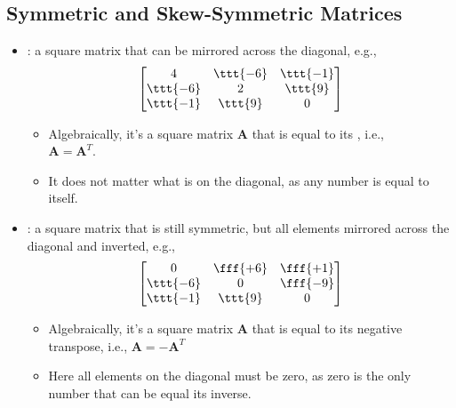 \begin{itemize}
  \subsection{Symmetric and Skew-Symmetric Matrices}\label{Symmetric and Skew-Symmetric Matrices}
  \begin{itemize}
    \item {}: a square matrix that can be mirrored across the diagonal, e.g.,
    \[%
    \begin{bmatrix}
    4 & \ttt{-6} & \ttt{-1} \\
    \ttt{-6} & 2 & \ttt{9} \\
    \ttt{-1} & \ttt{9} &  0
    \end{bmatrix}
    \]%
      \begin{itemize}
        \item Algebraically, it's a square matrix \(\bm{A}\) that is equal to its \hyperref[Transposition]{}, i.e., \\ \(\bm{A} = \bm{A}^T\).
        \item It does not matter what is on the diagonal, as any number is equal to itself. 
      \end{itemize}
    \item {}: a square matrix that is still symmetric, but all elements mirrored across the diagonal and inverted, e.g.,
    \[%
    \begin{bmatrix}
    0 & \fff{+6} & \fff{+1} \\
    \ttt{-6} & 0 & \fff{-9} \\
    \ttt{-1} & \ttt{9} &  0
    \end{bmatrix}
    \]%
    \begin{itemize}
      \item Algebraically, it's a square matrix \(\bm{A}\) that is equal to its negative transpose, i.e., \(\bm{A} = -\bm{A}^T\)
      \item Here all elements on the diagonal must be zero, as zero is the only number that can be equal its inverse. 
    \end{itemize}
  \end{itemize}
  

\end{itemize}
